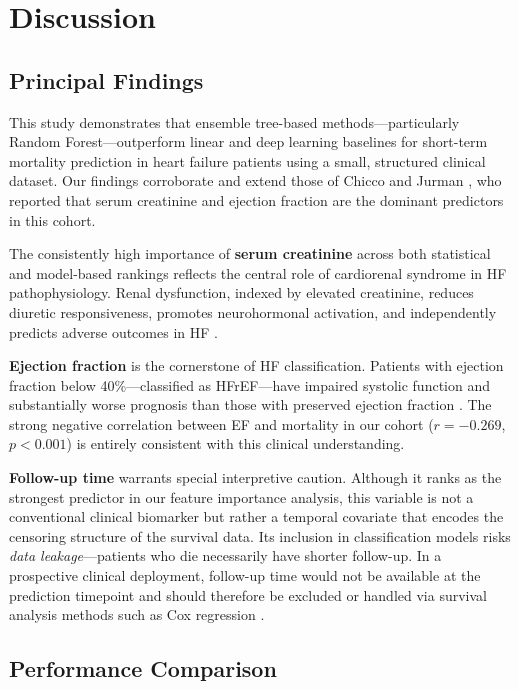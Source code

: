 \documentclass[12pt, a4paper]{article}
\begin{document}
\section{Discussion}
\label{sec:discussion}

\subsection{Principal Findings}

This study demonstrates that ensemble tree-based methods—particularly Random 
Forest—outperform linear and deep learning baselines for short-term mortality 
prediction in heart failure patients using a small, structured clinical 
dataset. Our findings corroborate and extend those of Chicco and 
Jurman \cite{chicco2020}, who reported that serum creatinine and 
ejection fraction are the dominant predictors in this cohort.

The consistently high importance of \textbf{serum creatinine} across both 
statistical and model-based rankings reflects the central role of 
cardiorenal syndrome in HF pathophysiology. Renal dysfunction, indexed by 
elevated creatinine, reduces diuretic responsiveness, promotes neurohormonal 
activation, and independently predicts adverse outcomes in HF \cite{damman2014}.

\textbf{Ejection fraction} is the cornerstone of HF classification. Patients 
with ejection fraction below 40\%—classified as HFrEF—have impaired systolic 
function and substantially worse prognosis than those with preserved ejection 
fraction \cite{ponikowski2016}. The strong negative correlation between EF 
and mortality in our cohort ($r = -0.269$, $p < 0.001$) is entirely 
consistent with this clinical understanding.

\textbf{Follow-up time} warrants special interpretive caution. Although it 
ranks as the strongest predictor in our feature importance analysis, this 
variable is not a conventional clinical biomarker but rather a temporal 
covariate that encodes the censoring structure of the survival data. Its 
inclusion in classification models risks \emph{data leakage}—patients who die 
necessarily have shorter follow-up. In a prospective clinical deployment, 
follow-up time would not be available at the prediction timepoint and should 
therefore be excluded or handled via survival analysis methods such as 
Cox regression \cite{ahmad2017}.

\subsection{Performance Comparison}
\end{document}
